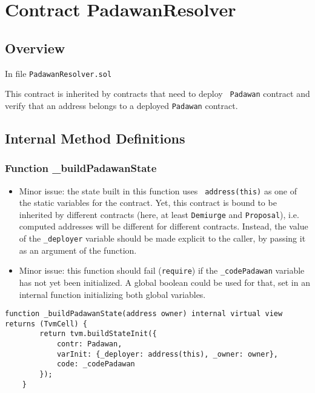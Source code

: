 
\chapter{Contract PadawanResolver}

\minitoc

\section{Overview}

In file {\tt PadawanResolver.sol}

This contract is inherited by contracts that need to deploy {\tt
  Padawan} contract and verify that an address belongs to a deployed
{\tt Padawan} contract.

\section{Internal Method Definitions}


\subsection{Function \_{}buildPadawanState}


\begin{itemize}
\item Minor issue: the state built in this function uses {\tt
  address(this)} as one of the static variables for the contract. Yet,
  this contract is bound to be inherited by different contracts (here,
  at least {\tt Demiurge} and {\tt Proposal}), i.e. computed addresses
  will be different for different contracts. Instead, the value of the
  {\tt \_deployer} variable should be made explicit to the caller, by
  passing it as an argument of the function.
\item Minor issue: this function should fail ({\tt require}) if the
  {\tt \_codePadawan} variable has not yet been initialized. A global
  boolean could be used for that, set in an internal function
  initializing both global variables.
\end{itemize}

\begin{lstlisting}[firstnumber=16]
    function _buildPadawanState(address owner) internal virtual view returns (TvmCell) {
        return tvm.buildStateInit({
            contr: Padawan,
            varInit: {_deployer: address(this), _owner: owner},
            code: _codePadawan
        });
    }
\end{lstlisting}
